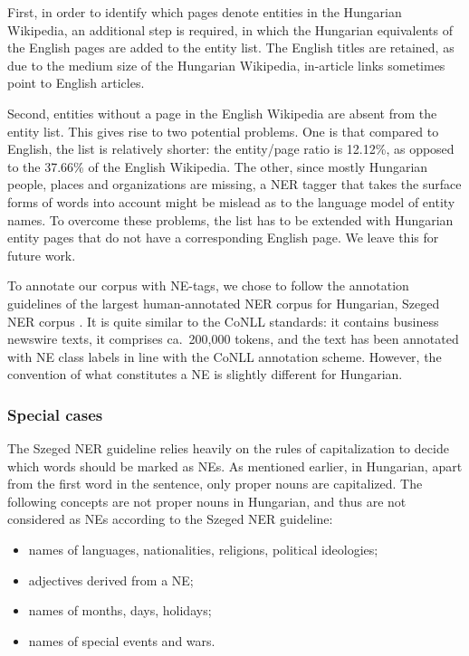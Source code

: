 \documentclass[11pt]{article}
\begin{document}
First, in order to identify which pages denote entities in the Hungarian Wikipedia, an additional step is required, in which the Hungarian equivalents of the English pages are added to the entity list. The English titles are retained, as due to the medium size of the Hungarian Wikipedia, in-article links sometimes point to English articles.

Second, entities without a page in the English Wikipedia are absent from the entity list. This gives rise to two potential problems. One is that compared to English, the list is relatively shorter: the entity/page ratio is 12.12\%, as opposed to the 37.66\% of the English Wikipedia. The other, since mostly Hungarian people, places and organizations are missing, a NER tagger that takes the surface forms of words into account might be mislead as to the language model of entity names. To overcome these problems, the list has to be extended with Hungarian entity pages that do not have a corresponding English page. We leave this for future work.

To annotate our corpus with NE-tags, we chose to follow the annotation guidelines of the largest human-annotated NER corpus for Hungarian, Szeged NER corpus \cite{Szarvas:06}. It is quite similar to the CoNLL standards: it contains business newswire texts, it comprises ca.~200,000 tokens, and the text has been annotated with NE class labels in line with the CoNLL annotation scheme. However, the convention of what constitutes a NE is slightly different for Hungarian. 

\subsubsection{Special cases}

The Szeged NER guideline relies heavily on the rules of capitalization to decide which words should be marked as NEs. As mentioned earlier, in Hungarian, apart from the first word in the sentence, only proper nouns are capitalized. The following concepts are not proper nouns in Hungarian, and thus are not considered as NEs according to the Szeged NER guideline:

\begin{itemize}
\item names of languages, nationalities, religions, political ideologies;
\item adjectives derived from a NE;
\item names of months, days, holidays;
\item names of special events and wars.
\end{itemize}
\end{document}

